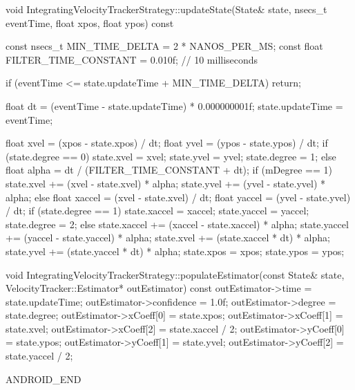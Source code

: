 void IntegratingVelocityTrackerStrategy::updateState(State& state,
                                                     nsecs_t eventTime, float xpos, float ypos) const {
    const nsecs_t MIN_TIME_DELTA = 2 * NANOS_PER_MS;
    const float FILTER_TIME_CONSTANT = 0.010f; // 10 milliseconds
    
    if (eventTime <= state.updateTime + MIN_TIME_DELTA) {
        return;
    }
    
    float dt = (eventTime - state.updateTime) * 0.000000001f;
    state.updateTime = eventTime;
    
    float xvel = (xpos - state.xpos) / dt;
    float yvel = (ypos - state.ypos) / dt;
    if (state.degree == 0) {
        state.xvel = xvel;
        state.yvel = yvel;
        state.degree = 1;
    } else {
        float alpha = dt / (FILTER_TIME_CONSTANT + dt);
        if (mDegree == 1) {
            state.xvel += (xvel - state.xvel) * alpha;
            state.yvel += (yvel - state.yvel) * alpha;
        } else {
            float xaccel = (xvel - state.xvel) / dt;
            float yaccel = (yvel - state.yvel) / dt;
            if (state.degree == 1) {
                state.xaccel = xaccel;
                state.yaccel = yaccel;
                state.degree = 2;
            } else {
                state.xaccel += (xaccel - state.xaccel) * alpha;
                state.yaccel += (yaccel - state.yaccel) * alpha;
            }
            state.xvel += (state.xaccel * dt) * alpha;
            state.yvel += (state.yaccel * dt) * alpha;
        }
    }
    state.xpos = xpos;
    state.ypos = ypos;
}

void IntegratingVelocityTrackerStrategy::populateEstimator(const State& state,
                                                           VelocityTracker::Estimator* outEstimator) const {
    outEstimator->time = state.updateTime;
    outEstimator->confidence = 1.0f;
    outEstimator->degree = state.degree;
    outEstimator->xCoeff[0] = state.xpos;
    outEstimator->xCoeff[1] = state.xvel;
    outEstimator->xCoeff[2] = state.xaccel / 2;
    outEstimator->yCoeff[0] = state.ypos;
    outEstimator->yCoeff[1] = state.yvel;
    outEstimator->yCoeff[2] = state.yaccel / 2;
}

ANDROID_END